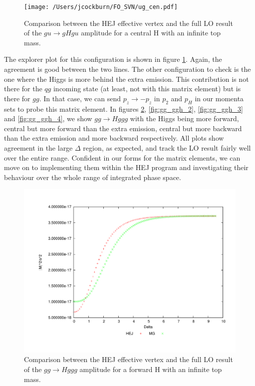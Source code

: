 \begin{figure}[t]
\centering
\texttt{[image: /Users/jcockburn/FO\_SVN/ug\_cen.pdf]}
\caption{Comparison between the HEJ effective vertex and the full LO result of the $gu \to gHgu$ amplitude for a central H with an infinite top mass.}
\label{fig:ug_cen}
\end{figure}


The explorer plot for this configuration is shown in figure \ref{fig:ug_cen}. Again, the agreement is good between the two lines. The other configuration to check is the one where the Higgs is more behind the extra emission. This contribution is not there for the $qg$ incoming state (at least, not with this matrix element) but is there for $gg$.  In that case, we can send $p_z \to -p_z$ in $p_2$ and $p_H$ in our momenta sets to probe this matrix element. In figures \ref{fig:gg_ggh_1}, \ref{fig:gg_ggh_2}, \ref{fig:gg_ggh_3} and \ref{fig:gg_ggh_4}, we show $gg \to Hggg$ with the Higgs being more forward, central but more forward than the extra emission, central but more backward than the extra emission and more backward respectively. All plots show agreement in the large $\Delta$ region, as expected, and track the LO result fairly well over the entire range. Confident in our forms for the matrix elements, we can move on to implementing them within the HEJ program and investigating their behaviour over the whole range of integrated phase space.

\begin{figure}[t]
\centering
\includegraphics[scale=0.47]{Images/gg_nextfor.pdf}
\caption{Comparison between the HEJ effective vertex and the full LO result of the $gg \to Hggg$ amplitude for a forward H with an infinite top mass.}
\label{fig:gg_ggh_1}
\end{figure}

